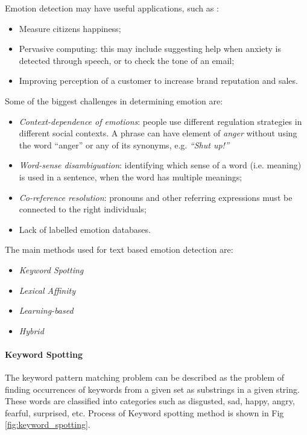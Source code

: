 Emotion detection may have useful applications, such as \cite{microsoft}: 
\begin{itemize}
\item Measure citizens happiness;
\item Pervasive computing: this may include suggesting help when anxiety is detected through speech, or to check the tone of an email; 
\item Improving perception of a customer to increase brand reputation and sales. 
\end{itemize}

Some of the biggest challenges in determining emotion are:
\begin{itemize}
\item \textit{Context-dependence of emotions}: people use different regulation strategies in different social contexts. A phrase can have element of \textit{anger} without using the word ``anger'' or any of its synonyms, e.g. \textit{``Shut up!''}
\item \textit{Word-sense disambiguation}: identifying which sense of a word (i.e. meaning) is used in a sentence, when the word has multiple meanings; 
\item \textit{Co-reference resolution}: pronouns and other referring expressions must be connected to the right individuals;
\item Lack of labelled emotion databases. 
\end{itemize}

The main methods used for text based emotion detection are: 
\begin{itemize}
\item \textit{Keyword Spotting}
\item \textit{Lexical Affinity}
\item \textit{Learning-based}
\item \textit{Hybrid}
\end{itemize}

\paragraph{Keyword Spotting}
The keyword pattern matching problem can be described as the problem of finding occurrences of keywords from a given set as substrings in a given string. These words are classified into categories such as disgusted, sad, happy, angry, fearful, surprised, etc. Process of Keyword spotting method is  shown in Fig \ref{fig:keyword_spotting}. 

